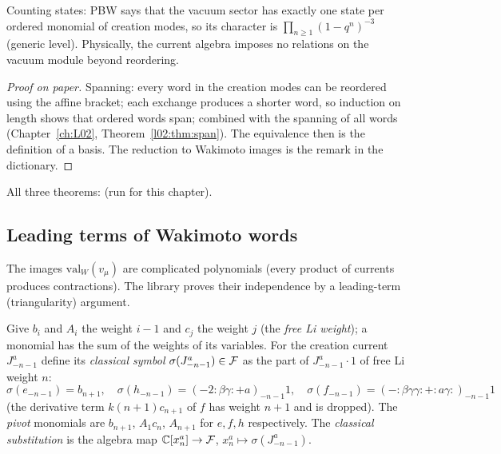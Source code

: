 \begin{physics}
Counting states: PBW says that the vacuum sector has exactly one state per ordered monomial of
creation modes, so its character is $\prod_{n\ge1}(1-q^n)^{-3}$ (generic level). Physically, the
current algebra imposes no relations on the vacuum module beyond reordering.
\end{physics}

\begin{proof}[Proof on paper]
Spanning: every word in the creation modes can be reordered using the affine bracket; each exchange
produces a shorter word, so induction on length shows that ordered words span; combined with the
spanning of all words (Chapter~\ref{ch:L02}, Theorem~\ref{l02:thm:span}). The equivalence then is the
definition of a basis. The reduction to Wakimoto images is the remark in the dictionary.
\end{proof}

\begin{status}
All three theorems: \lean{[propext, Classical.}\allowbreak{}\allowbreak\lean{sound]} (run for this chapter).
\end{status}

\subsection{Leading terms of Wakimoto words}

The images $\mathrm{val}_W(v_\mu)$ are complicated polynomials (every product of currents produces
contractions). The library proves their independence by a leading-term (triangularity) argument.

\begin{definition}\label{l08:def:classical}
Give $b_i$ and $A_i$ the weight $i-1$ and $c_j$ the weight $j$ (the \emph{free Li weight}); a monomial
has the sum of the weights of its variables. For the creation current $J^a_{-n-1}$ define its
\emph{classical symbol} $\sigma(J^a_{-n-1})\in\mathcal{F}$ as the part of $J^a_{-n-1}\cdot1$ of free
Li weight $n$:
\begin{equation*}
  \sigma(e_{-n-1}) = b_{n+1},\quad \sigma(h_{-n-1}) = (-2{:}\beta\gamma{:}+a)_{-n-1}1,\quad
  \sigma(f_{-n-1}) = (-{:}\beta\gamma\gamma{:}+{:}a\gamma{:})_{-n-1}1
\end{equation*}
(the derivative term $k(n+1)c_{n+1}$ of $f$ has weight $n+1$ and is dropped). The \emph{pivot}
monomials are $b_{n+1}$, $A_1c_n$, $A_{n+1}$ for $e,f,h$ respectively. The \emph{classical
substitution} is the algebra map ${\mathbb{C}}[x^a_n]\to\mathcal{F}$, $x^a_n\mapsto\sigma(J^a_{-n-1})$.
\end{definition}

